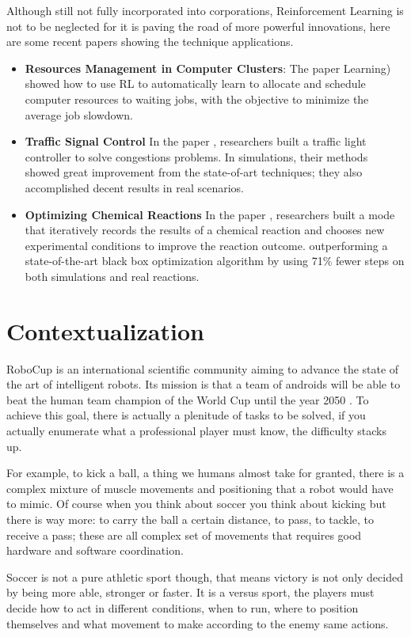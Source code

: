 Although still not fully incorporated into corporations, Reinforcement Learning is not to be neglected for it is paving the road of more powerful innovations, here are some recent papers showing the technique applications.
\
\begin{itemize}
	\item{\textbf{Resources Management in Computer Clusters}}: The paper \cite{Resource} Learning)  showed how to use RL to automatically learn to allocate and schedule computer resources to waiting jobs, with the objective to minimize the average job slowdown.
	\item \textbf{Traffic Signal Control }In the paper \cite{Traffic}, researchers built a traffic light controller to solve congestions problems. In simulations, their methods showed great improvement from the state-of-art techniques; they also accomplished decent results in real scenarios.
	\item \textbf{Optimizing Chemical Reactions} In the paper \cite{Chemistry}, researchers built a mode that iteratively records the results of a chemical reaction and chooses new experimental conditions to improve the reaction outcome. outperforming a state-of-the-art black box optimization algorithm by using 71\% fewer steps on both simulations and real reactions. 
\end{itemize}

\section{Contextualization}

RoboCup is an international scientific community aiming to advance the state of the art of intelligent robots. Its mission is that a team of androids will be able to beat the human team champion of the World Cup until the year 2050 \cite{RoboCup}. To achieve this goal, there is actually a plenitude of tasks to be solved, if you actually enumerate what a professional player must know, the difficulty stacks up. 

For example, to kick a ball, a thing we humans almost take for granted, there is a complex mixture of muscle movements and positioning that a robot would have to mimic. Of course when you think about soccer you think about kicking but there is way more: to carry the ball a certain distance, to pass, to tackle, to receive a pass; these are all complex set of movements that requires good hardware and software coordination.

Soccer is not a pure athletic sport though, that means victory is not only decided by being more able, stronger or faster. It is a versus sport, the players must decide how to act in different conditions, when to run, where to position themselves and what movement to make according to the enemy same actions.

